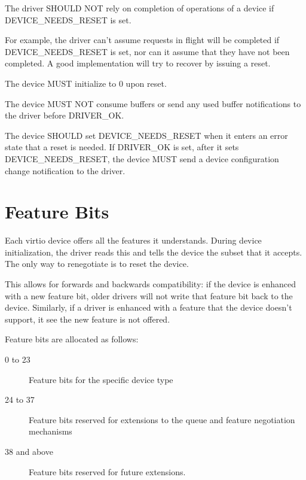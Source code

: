 The driver SHOULD NOT rely on completion of operations of a
device if DEVICE_NEEDS_RESET is set.
\begin{note}
For example, the driver can't assume requests in flight will be
completed if DEVICE_NEEDS_RESET is set, nor can it assume that
they have not been completed.  A good implementation will try to
recover by issuing a reset.
\end{note}

The device MUST initialize  to 0 upon reset.

The device MUST NOT consume buffers or send any used buffer
notifications to the driver before DRIVER_OK.

\label{sec:Basic Facilities of a Virtio Device / Device Status Field / DEVICENEEDSRESET}The device SHOULD set DEVICE_NEEDS_RESET when it enters an error state
that a reset is needed.  If DRIVER_OK is set, after it sets DEVICE_NEEDS_RESET, the device
MUST send a device configuration change notification to the driver.

\section{Feature Bits}\label{sec:Basic Facilities of a Virtio Device / Feature Bits}

Each virtio device offers all the features it understands.  During
device initialization, the driver reads this and tells the device the
subset that it accepts.  The only way to renegotiate is to reset
the device.

This allows for forwards and backwards compatibility: if the device is
enhanced with a new feature bit, older drivers will not write that
feature bit back to the device.  Similarly, if a driver is enhanced with a feature
that the device doesn't support, it see the new feature is not offered.

Feature bits are allocated as follows:

\begin{description}
\item[0 to 23] Feature bits for the specific device type

\item[24 to 37] Feature bits reserved for extensions to the queue and
  feature negotiation mechanisms

\item[38 and above] Feature bits reserved for future extensions.
\end{description}

